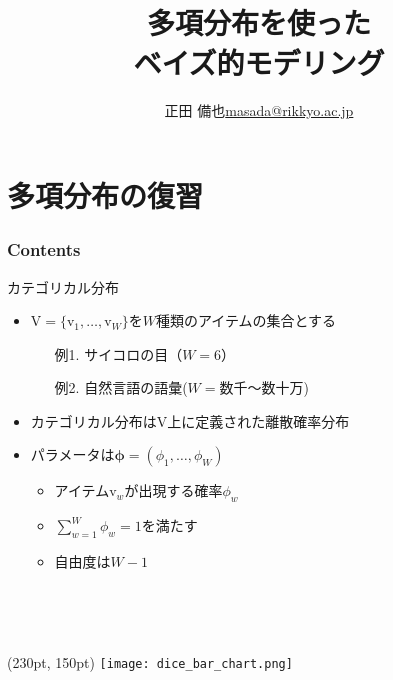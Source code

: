 \documentclass[aspectratio=169,unicode,dvipdfmx,14pt]{beamer}
\title{ \\多項分布を使った\\ベイズ的モデリング}
\author{\texorpdfstring{正田 備也\newline\href{mailto:masada@rikkyo.ac.jp}{masada@rikkyo.ac.jp}}{正田 備也}}
\date{}
\begin{document}
\begin{frame}
\titlepage
\end{frame}

\section{多項分布の復習}

\begin{frame}\frametitle{Contents}
\Large \tableofcontents[currentsection]
\end{frame}

\begin{frame}{カテゴリカル分布}
\begin{itemize}
\item $\mbox{V}=\{\mbox{v}_1,\ldots,\mbox{v}_W\}$を$W$種類のアイテムの集合とする
\begin{itemize}
\item[例1.] サイコロの目（$W=6$）
\item[例2.] 自然言語の語彙($W=\mbox{数千〜数十万}$)
\end{itemize}
\item カテゴリカル分布は$\mbox{V}$上に定義された離散確率分布
\item パラメータは$\bm{\phi}=(\phi_1,\ldots,\phi_W)$
\begin{itemize}
\item アイテム$\mbox{v}_w$が出現する確率$\phi_w$
\item $\sum_{w=1}^W \phi_w = 1$を満たす
\item 自由度は$W-1$
\item[] \ 
\item[] \ 
\end{itemize}
\end{itemize}
\begin{textblock*}{0.5\linewidth}(230pt, 150pt)
    \centering
    \texttt{[image: dice\_bar\_chart.png]}
\end{textblock*}
\end{frame}
\end{document}
